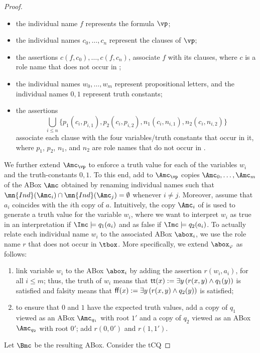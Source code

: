 \documentclass{lmcs}
\theoremstyle{definition}
\begin{document}
\begin{proof}
  \begin{itemize}
    \item the individual name $f$ represents the formula $\vp$;
    \item the individual names $c_0,\dots,c_n$ represent the clauses of
      $\vp$;
    \item the assertions $c(f,c_0), \dots, c(f,c_{n})$, associate $f$ with
      its clauses, where $c$ is a role name that does not occur in \Tmc;
    \item the individual names $w_0,\dots,w_m$ represent propositional 
      letters, and the individual names $0,1$ represent truth constants;
    \item the assertions
        $$
        \bigcup_{i \leq n} \{ p_1(c_i,p_{i,1}), p_2(c_i,p_{i,2}),
        n_1(c_i,n_{i,1}), n_2(c_i,n_{i,2}) \}
        $$
        associate each clause with the four variables/truth constants that
        occur in it, where $p_1$, $p_2$, $n_1$, and $n_2$ are role names that do not
        occur in \Tmc.
  \end{itemize}
  We further extend $\Amc_\vp$ to enforce a truth value for each of
  the variables $w_i$ and the truth-constants $0,1$. To this end, add
  to $\Amc_\vp$ copies $\Amc_0,\dots,\Amc_{m}$ of the ABox $\Amc$ 
  obtained by renaming individual names such that $\mn{Ind}(\Amc_i) 
  \cap \mn{Ind}(\Amc_j) = \emptyset$ whenever $i \neq j$. Moreover, 
  assume that $a_{i}$ coincides with the $i$th copy
  of $a$.  Intuitively, the copy $\Amc_i$ of \Amc is used to generate
  a truth value for the variable $w_i$, where we want to interpret
  $w_i$ as true in an interpretation \Imc if $\Imc \models q_1(a_i)$ 
  and as false if $\Imc \models q_2(a_i)$. To actually relate each 
  individual name $w_i$ to the associated ABox $\abox_i$, we use the 
  role name $r$ that does not occur in $\tbox$. More 
  specifically, we extend $\abox_\varphi$ as follows:
  \begin{enumerate}
    \item link variable $w_i$ to the ABox $\abox_i$ by adding the 
      assertion $r(w_i,a_i)$, for all $i\leq m$; thus, the truth of 
      $w_i$ means that ${\sf tt}(x):=\exists y\,(r(x,y) \wedge q_{1}(y))$ is satisfied and falsity 
      means that ${\sf ff}(x):=\exists y\,(r(x,y) \wedge q_2(y))$ is satisfied;
    
    \item to ensure that $0$ and $1$ have the expected truth values, 
      add a copy of $q_1$ viewed as an ABox $\Amc_{q_{1}}$ with root $1'$ and a copy 
      of $q_2$ viewed as an ABox $\Amc_{q_{2}}$ with root $0'$; add $r(0,0')$ and 
      $r(1,1')$.
  \end{enumerate}
  Let $\Bmc$ be the resulting ABox. Consider the tCQ
   

\end{proof}
\end{document}
